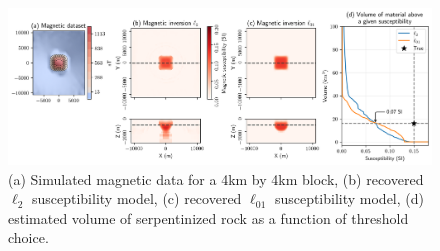 \begin{figure}[!htb]
    \begin{center}
    \includegraphics[width=1\textwidth]{figures/one-block-magnetics.png}
    \end{center}
\caption{
     (a) Simulated magnetic data for a 4km by 4km block, (b) recovered $\ell_2$ susceptibility model, (c) recovered $\ell_{01}$ susceptibility model, (d) estimated volume of serpentinized rock as a function of threshold choice.
}
\label{fig:one-block-magnetics}
\end{figure}
